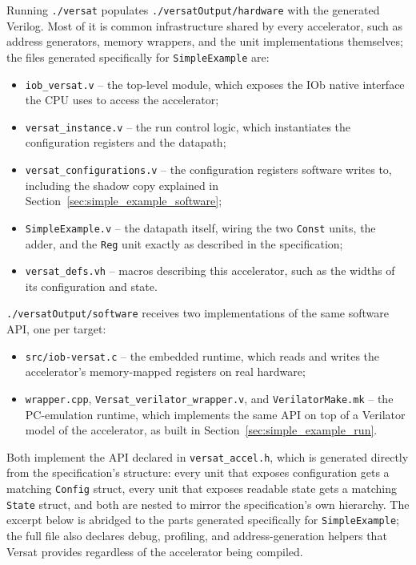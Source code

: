 %

Running \texttt{./versat} populates \texttt{./versatOutput/hardware} with the generated Verilog. Most of it is common infrastructure shared by every accelerator, such as address generators, memory wrappers, and the unit implementations themselves; the files generated specifically for \texttt{SimpleExample} are:

\begin{itemize}
  \itemsep-0.5em
  \item \texttt{iob\_versat.v} -- the top-level module, which exposes the IOb native interface the CPU uses to access the accelerator;
  \item \texttt{versat\_instance.v} -- the run control logic, which instantiates the configuration registers and the datapath;
  \item \texttt{versat\_configurations.v} -- the configuration registers software writes to, including the shadow copy explained in Section~\ref{sec:simple_example_software};
  \item \texttt{SimpleExample.v} -- the datapath itself, wiring the two \texttt{Const} units, the adder, and the \texttt{Reg} unit exactly as described in the specification;
  \item \texttt{versat\_defs.vh} -- macros describing this accelerator, such as the widths of its configuration and state.
\end{itemize}

\texttt{./versatOutput/software} receives two implementations of the same software API, one per target:

\begin{itemize}
  \itemsep-0.5em
  \item \texttt{src/iob-versat.c} -- the embedded runtime, which reads and writes the accelerator's memory-mapped registers on real hardware;
  \item \texttt{wrapper.cpp}, \texttt{Versat\_verilator\_wrapper.v}, and \texttt{VerilatorMake.mk} -- the PC-emulation runtime, which implements the same API on top of a Verilator model of the accelerator, as built in Section~\ref{sec:simple_example_run}.
\end{itemize}

Both implement the API declared in \texttt{versat\_accel.h}, which is generated directly from the specification's structure: every unit that exposes configuration gets a matching \texttt{Config} struct, every unit that exposes readable state gets a matching \texttt{State} struct, and both are nested to mirror the specification's own hierarchy. The excerpt below is abridged to the parts generated specifically for \texttt{SimpleExample}; the full file also declares debug, profiling, and address-generation helpers that Versat provides regardless of the accelerator being compiled.


